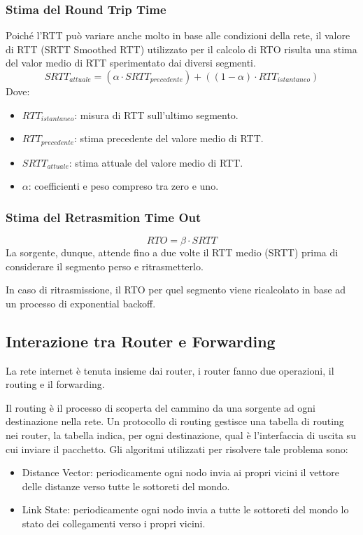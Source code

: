\documentclass[oneside,a4paper,11pt]{book}
\theoremstyle{italicstyle}
\theoremstyle{normStyle}
\begin{document}
\subsubsection{Stima del Round Trip Time}
Poiché l'RTT può variare anche molto in base alle condizioni della rete, 
il valore di RTT (SRTT Smoothed RTT) utilizzato per il calcolo di RTO risulta una stima del valor medio 
di RTT sperimentato dai diversi segmenti.
\[
  SRTT_{attuale} = (\alpha \cdot SRTT_{precedente})+((1-\alpha)\cdot RTT_{istantaneo})
\]
Dove:
\begin{itemize}
  \item $RTT_{istantaneo}$: misura di RTT sull'ultimo segmento.
  \item $RTT_{precedente}$: stima precedente del valore medio di RTT.
  \item $SRTT_{attuale}$: stima attuale del valore medio di RTT.
  \item $\alpha$: coefficienti e peso compreso tra zero e uno.
\end{itemize}
\subsubsection{Stima del Retrasmition Time Out}
\[
  RTO = \beta \cdot SRTT
\]
La sorgente, dunque, attende fino a due volte il RTT medio (SRTT) 
prima di considerare il segmento perso e ritrasmetterlo.

In caso di ritrasmissione, il RTO per quel segmento viene ricalcolato
in base ad un processo di exponential backoff.
\subsection{Interazione tra Router e Forwarding}
La rete internet è tenuta insieme dai router, i router fanno
due operazioni, il routing e il forwarding.

Il routing è il processo di scoperta del cammino da una sorgente ad ogni destinazione
nella rete. Un protocollo di routing gestisce una tabella di routing nei router, la tabella
indica, per ogni destinazione, qual è l'interfaccia di uscita su cui inviare il pacchetto.
Gli algoritmi utilizzati per risolvere tale problema sono:
\begin{itemize}
  \item Distance Vector: periodicamente ogni nodo invia ai propri vicini il
  vettore delle distanze verso tutte le sottoreti del mondo.
  \item Link State: periodicamente ogni nodo invia a tutte le sottoreti 
  del mondo lo stato dei collegamenti verso i propri vicini.
\end{itemize}
\end{document}
